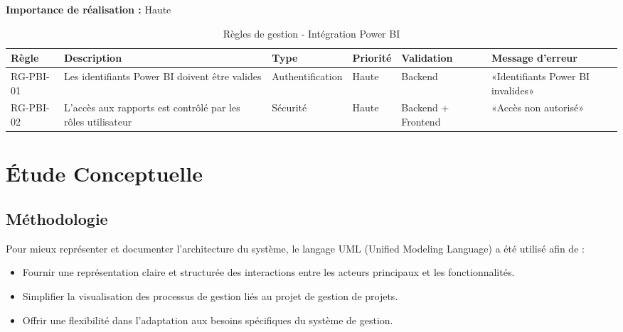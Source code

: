 \textbf{Importance de réalisation :} Haute

    \begin{table}[H]
        \centering
\footnotesize
\begin{tabular}{|p{1.5cm}|p{3.5cm}|p{1.5cm}|p{1.5cm}|p{2cm}|p{2.5cm}|}
            \hline
\textbf{Règle} & \textbf{Description} & \textbf{Type} & \textbf{Priorité} & \textbf{Validation} & \textbf{Message d'erreur} \\
            \hline
RG-PBI-01 & Les identifiants Power BI doivent être valides & Authentification & Haute & Backend & «Identifiants Power BI invalides» \\
            \hline
RG-PBI-02 & L'accès aux rapports est contrôlé par les rôles utilisateur & Sécurité & Haute & Backend + Frontend & «Accès non autorisé» \\
            \hline
        \end{tabular}
\caption{Règles de gestion - Intégration Power BI}
        \label{tab:rg_powerbi}
    \end{table}


\section{Étude Conceptuelle}
\label{sec:etude_conceptuelle}

\subsection{Méthodologie}
\label{ssec:methodologie}

Pour mieux représenter et documenter l'architecture du système, le langage UML (Unified Modeling Language) a été utilisé afin de :
\begin{itemize}
    \item Fournir une représentation claire et structurée des interactions entre les acteurs principaux et les fonctionnalités.
    \item Simplifier la visualisation des processus de gestion liés au projet de gestion de projets.
    \item Offrir une flexibilité dans l'adaptation aux besoins spécifiques du système de gestion.
\end{itemize}

